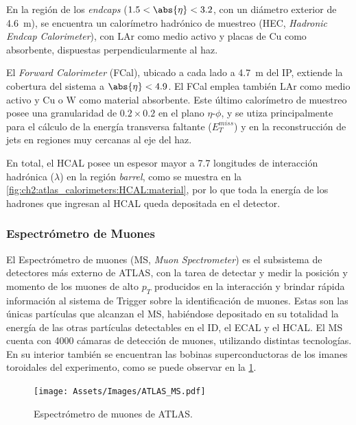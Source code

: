 En la región de los \textit{endcaps} ($1.5 < \abs{\eta} < 3.2$, con un diámetro exterior de \SI{4.6}{\meter}), se encuentra un calorímetro hadrónico de muestreo (HEC, \textit{Hadronic Endcap Calorimeter}), con $\textrm{LAr}$ como medio activo y placas de $\textrm{Cu}$ como absorbente, dispuestas perpendicularmente al haz.

El \textit{Forward Calorimeter} (FCal), ubicado a cada lado a \SI{4.7}{\meter} del IP, extiende la cobertura del sistema a $\abs{\eta} < 4.9$. El FCal emplea también $\textrm{LAr}$ como medio activo y $\textrm{Cu}$ o $\textrm{W}$ como material absorbente. Este último calorímetro de muestreo posee una granularidad de $0.2\times0.2$ en el plano $\eta$-$\phi$, y se utiza principalmente para el cálculo de la energía transversa faltante ($E_T^{miss}$) y en la reconstrucción de jets en regiones muy cercanas al eje del haz.

En total, el HCAL posee un espesor mayor a 7.7 longitudes de interacción hadrónica ($\lambda$) en la región \textit{barrel}, como se muestra en la \cref{fig:ch2:atlas_calorimeters:HCAL:material}, por lo que toda la energía de los hadrones que ingresan al HCAL queda depositada en el detector.

\subsubsection{Espectrómetro de Muones}

El Espectrómetro de muones (MS, \textit{Muon Spectrometer}) es el subsistema de detectores más externo de ATLAS, con la tarea de detectar y medir la posición y momento de los muones de alto $p_T$ producidos en la interacción y brindar rápida información al sistema de Trigger sobre la identificación de muones. Estas son las únicas partículas que alcanzan el MS, habiéndose depositado en su totalidad la energía de las otras partículas detectables en el ID, el ECAL y el HCAL. El MS cuenta con 4000 cámaras de detección de muones, utilizando distintas tecnologías. En su interior también se encuentran las bobinas superconductoras de los imanes toroidales del experimento, como se puede observar en la \cref{fig:ch2:atlas_MS}.

\begin{figure}[t]
    \centering
    \texttt{[image: Assets/Images/ATLAS\_MS.pdf]}
    \caption{Espectrómetro de muones de ATLAS.}
    \label{fig:ch2:atlas_MS}
\end{figure}

